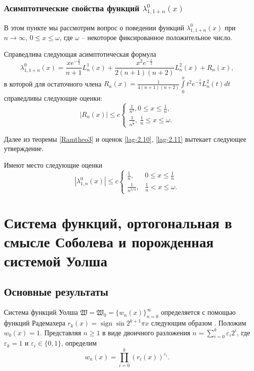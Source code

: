 \subsection{Асимптотические свойства функций $\lambda_{1,1+n}^{0}(x)$}
В этом пункте мы рассмотрим вопрос о поведении функций $\lambda_{1,1+n}^{0}(x)$ при $n\rightarrow\infty$, $0\leq x\leq \omega$, где $\omega$ -- некоторое фиксированное положительное число.
\begin{theorem}\label{Ramtheo3}
	Справедлива следующая асимптотическая формула
	\begin{equation*}
	\lambda_{1,1+n}^{0}(x) = \frac{xe^{-\frac{x}{2}}}{n+1}L_n^1(x)+\frac{x^2e^{-\frac{x}{2}}}{2(n+1)(n+2)}L_n^2(x)+R_n(x),
	\end{equation*}
	в которой для остаточного члена $R_n(x)=\frac{1}{4(n+1)(n+2)}\int\limits_0^x t^2e^{-\frac{t}{2}}L_{n}^{2}(t)dt$ справедливы следующие оценки:
	\begin{equation*}
	|R_n(x)|\leq
	c \left\{\begin{gathered}
	\frac{1}{n^3}, 0\leq x\leq \frac{1}{n},\\
	\frac{1}{n^\frac{7}{4}},\ \frac{1}{n}\leq x\leq \omega.
	\end{gathered}\right.
	\end{equation*}
\end{theorem}
Далее из теоремы \ref{Ramtheo3} и оценок \eqref{lag-2.10}, \eqref{lag-2.11} вытекает следующее утверждение.
\begin{corollary}
	Имеют место следующие оценки
	$$
	|\lambda_{1,n}^{0}(x)|\leq c
	\begin{cases}
	\frac{1}{n}, & 0\leq x\leq \frac{1}{n} \\
	\frac{1}{n^{3/4}}, & \frac{1}{n}< x\leq \omega.
	\end{cases}
	$$
\end{corollary}







\chapter{Система функций, ортогональная в смысле Соболева и порожденная системой Уолша}

\section{Основные результаты}
Система функций Уолша $\mathfrak{W}=\mathfrak{W}_0=\{w_n(x)\}_{n=0}^\infty$ определяется с помощью функций Радемахера $r_k(x)=\operatorname{sign}\sin 2^{k+1}\pi x$ следующим образом \cite{walsh-GolubovBook}. Положим $w_0(x)=1$. Представляя $n \ge 1$ в виде двоичного разложения $n=\sum_{i=0}^{k}\varepsilon_i2^i$, где $\varepsilon_k=1$ и $\varepsilon_i \in \{0,1\}$, определим
\begin{equation}
w_n(x)=\prod_{i=0}^{k}(r_i(x))^{\varepsilon_i}.
\end{equation}

